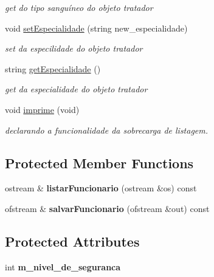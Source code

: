 \begin{DoxyCompactItemize}
\begin{DoxyCompactList}\small\item\em get do tipo sanguíneo do objeto tratador \end{DoxyCompactList}\item 
void \mbox{\hyperlink{class_tratador_a6fdd83ffb609aab0f335892c9df5c146}{set\+Especialidade}} (string new\+\_\+especialidade)
\begin{DoxyCompactList}\small\item\em set da especilidade do objeto tratador \end{DoxyCompactList}\item 
string \mbox{\hyperlink{class_tratador_a41a7697865fc0a821f06102b86f160b7}{get\+Especialidade}} ()
\begin{DoxyCompactList}\small\item\em get da especialidade do objeto tratador \end{DoxyCompactList}\item 
\mbox{\label{class_tratador_a85da3b8c8b074303b72e97e2590c6496}} 
void \mbox{\hyperlink{class_tratador_a85da3b8c8b074303b72e97e2590c6496}{imprime}} (void)
\begin{DoxyCompactList}\small\item\em declarando a funcionalidade da sobrecarga de listagem. \end{DoxyCompactList}\end{DoxyCompactItemize}
\subsection*{Protected Member Functions}
\begin{DoxyCompactItemize}
\item 
\mbox{\label{class_tratador_a306893eae5430fa7c2cc2856005d1175}} 
ostream \& {\bfseries listar\+Funcionario} (ostream \&os) const
\item 
\mbox{\label{class_tratador_ae56a01311e9ef61a3615342cec3eba37}} 
ofstream \& {\bfseries salvar\+Funcionario} (ofstream \&out) const
\end{DoxyCompactItemize}
\subsection*{Protected Attributes}
\begin{DoxyCompactItemize}
\item 
\mbox{\label{class_tratador_a955a2ce3f9652bcc43b914b2a325f763}} 
int {\bfseries m\+\_\+nivel\+\_\+de\+\_\+seguranca}
\end{DoxyCompactItemize}


